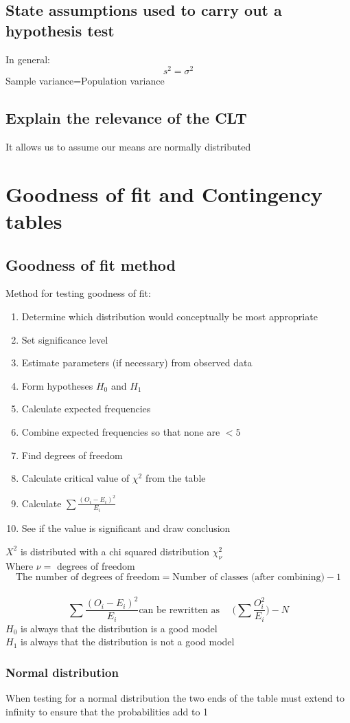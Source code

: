 \documentclass{article}[18pt]
\begin{document}
\subsection{State assumptions used to carry out a hypothesis test}
In general:
$$s^2=\sigma^2$$
Sample variance=Population variance
\subsection{Explain the relevance of the CLT}
It allows us to assume our means are normally distributed
\newpage
\section{Goodness of fit and Contingency tables}
\subsection{Goodness of fit method}
Method for testing goodness of fit:
\begin{enumerate}
\item Determine which distribution would conceptually be most appropriate
\item Set significance level
\item Estimate parameters (if necessary) from observed data
\item Form hypotheses $H_0$ and $H_1$
\item Calculate expected frequencies
\item Combine expected frequencies so that none are $<5$
\item Find degrees of freedom
\item Calculate critical value of $\chi^2$ from the table
\item Calculate $\sum\frac{(O_i-E_i)^2}{E_i}$
\item See if the value is significant and draw conclusion
\end{enumerate}
$X^2$ is distributed with a chi squared distribution $\chi^2_\nu$\\
Where $\nu=$ degrees of freedom\\
$$\textrm{The number of degrees of freedom}=\textrm{Number of classes (after combining)}-1$$
\\
$$\sum\frac{(O_i-E_i)^2}{E_i} \textrm{can be rewritten as  } \quad \Bigg(\sum\frac{O^2_i}{E_i}\Bigg)-N$$
$H_0$ is always that the distribution is a good model\\
$H_1$ is always that the distribution is not a good model
\subsubsection{Normal distribution}
When testing for a normal distribution the two ends of the table must extend to infinity to ensure that the probabilities add to 1
\end{document}
